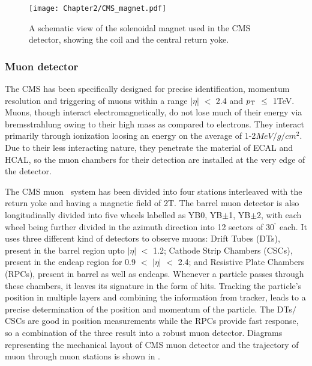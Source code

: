 \begin{figure}[t]
\begin{center}
\texttt{[image: Chapter2/CMS\_magnet.pdf]}
\caption{A schematic view of the solenoidal magnet used in the CMS detector, showing the coil and the central return yoke.}
\label{fig:Magnet}
\end{center}
\end{figure}

\subsubsection{Muon detector}
The CMS has been specifically designed for precise identification, momentum resolution and triggering of muons within a range $|\eta|$ $<$ 2.4 and $p_{\mathrm T}$
$\leq$ 1\unit{TeV}. Muons, though interact electromagnetically,
do not lose much of their energy via bremsstrahlung owing to their high mass as compared to electrons. They interact primarily through ionization loosing
an energy on the average of 1-2$\unit{MeV/g/cm^{2}}$. Due to their less interacting nature, they penetrate the material of ECAL and HCAL, so the muon chambers for their
detection are installed at the very edge of the detector. 

The CMS muon~\cite{muonTDR} system has been divided into four stations interleaved with the return yoke and having a magnetic field of 2\unit{T}.
The barrel muon detector is also longitudinally divided into five wheels labelled as YB0, YB$\pm$1, YB$\pm$2, with each wheel being further divided in the azimuth
direction into 12 sectors of 30$^{^{\circ}}$ each. It uses
three different kind of detectors to observe muons: Drift Tubes (DTs), present in the barrel region upto $|\eta|$ $<$ 1.2; Cathode Strip Chambers (CSCs), present
in the endcap region for 0.9 $<$ $|\eta|$ $<$ 2.4; and Resistive Plate Chambers (RPCs), present in barrel as well as endcaps. Whenever a particle passes through these
chambers, it leaves its signature in the form of hits. Tracking the particle's position in multiple layers and combining the information from tracker, leads to
a precise determination of the position and momentum of the particle. The DTs$/$CSCs are good in position measurements while the RPCs provide
fast response, so a combination
of the three result into a robust muon detector. Diagrams representing the mechanical layout of CMS muon detector and the trajectory of muon through muon stations
is shown in \fig{\ref{fig:CMS_Muon}}.
 
